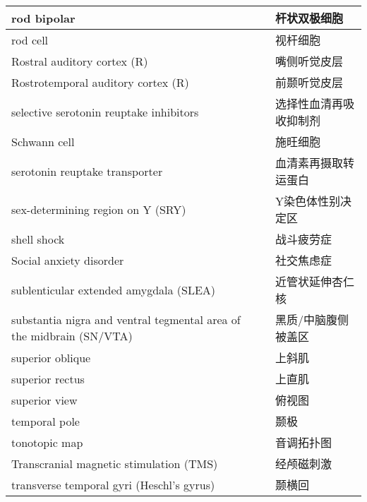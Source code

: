 \begin{longtable}{lll}
	\midrule
	rod bipolar   && 杆状双极细胞  \\
	
	\midrule
	rod cell   && 视杆细胞  \\
	
	\midrule
	Rostral auditory cortex (R)   && 嘴侧听觉皮层  \\
	
	\midrule
	Rostrotemporal auditory cortex (R)   && 前颞听觉皮层 \\
	
	\midrule
	selective serotonin reuptake inhibitors   && 选择性血清再吸收抑制剂 \\
	
	\midrule
	Schwann cell   && 施旺细胞 \\
	
	\midrule
	serotonin reuptake transporter   && 血清素再摄取转运蛋白 \\
	
	\midrule
	sex-determining region on Y (SRY)   && Y染色体性别决定区 \\
	
	\midrule
	shell shock   && 战斗疲劳症 \\
	
	\midrule
	Social anxiety disorder   && 社交焦虑症 \\
	
	\midrule
	sublenticular extended amygdala (SLEA)   && 近管状延伸杏仁核 \\
	
	\midrule
	substantia nigra and ventral tegmental area of the midbrain (SN/VTA)   && 黑质/中脑腹侧被盖区 \\
	
	\midrule
	superior oblique   && 上斜肌 \\
	
	\midrule
	superior rectus   && 上直肌 \\
	
	\midrule
	superior view   && 俯视图 \\
	
	\midrule
	temporal pole   && 颞极  \\
	
	\midrule
	tonotopic map   && 音调拓扑图  \\
	
	\midrule
	Transcranial magnetic stimulation (TMS)   && 经颅磁刺激  \\
	
	\midrule
	transverse temporal gyri (Heschl's gyrus)   && 颞横回  \\
	

\end{longtable}
